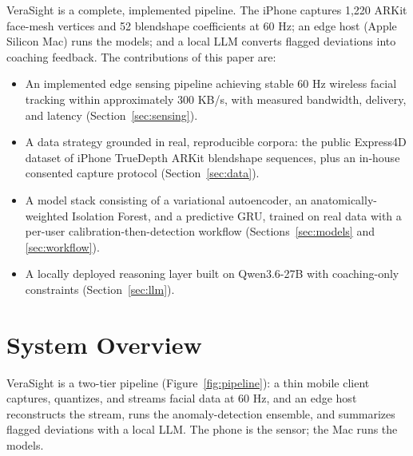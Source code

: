 \documentclass[sigconf]{acmart}
\begin{document}
VeraSight is a complete, implemented pipeline. The iPhone captures 1,220
ARKit face-mesh vertices and 52 blendshape coefficients at 60 Hz; an edge host
(Apple Silicon Mac) runs the models; and a local LLM converts flagged
deviations into coaching feedback. The contributions of this paper are:
\begin{itemize}
    \item An implemented edge sensing pipeline achieving stable 60 Hz wireless
          facial tracking within approximately 300 KB/s, with measured
          bandwidth, delivery, and latency (Section~\ref{sec:sensing}).
    \item A data strategy grounded in real, reproducible corpora: the public
          Express4D dataset of iPhone TrueDepth ARKit blendshape sequences, plus
          an in-house consented capture protocol (Section~\ref{sec:data}).
    \item A model stack consisting of a variational autoencoder, an
          anatomically-weighted Isolation Forest, and a predictive GRU, trained
          on real data with a per-user calibration-then-detection workflow
          (Sections~\ref{sec:models} and \ref{sec:workflow}).
    \item A locally deployed reasoning layer built on Qwen3.6-27B with
          coaching-only constraints (Section~\ref{sec:llm}).
\end{itemize}

\section{System Overview}

VeraSight is a two-tier pipeline (Figure~\ref{fig:pipeline}): a thin mobile
client captures, quantizes, and streams facial data at 60 Hz, and an edge host
reconstructs the stream, runs the anomaly-detection ensemble, and summarizes
flagged deviations with a local LLM. The phone is the sensor; the Mac runs the
models.
\end{document}
